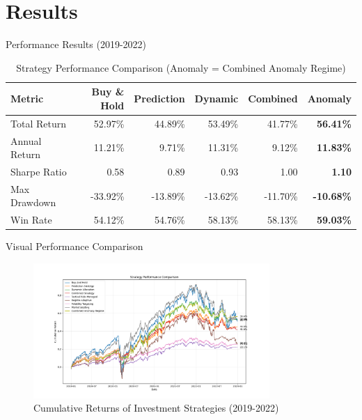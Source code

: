 \documentclass[aspectratio=169,xcolor=dvipsnames]{beamer}
\begin{document}
\section{Results}
\begin{frame}{Performance Results (2019-2022)}
	\begin{table}
		\begin{tabular}{l r r r r r}
			\toprule
			\textbf{Metric} & \textbf{Buy \& Hold} & \textbf{Prediction} & \textbf{Dynamic} & \textbf{Combined} & \textbf{Anomaly}  \\
			\midrule
			Total Return    & 52.97\%              & 44.89\%             & 53.49\%          & 41.77\%           & \textbf{56.41\%}  \\
			Annual Return   & 11.21\%              & 9.71\%              & 11.31\%          & 9.12\%            & \textbf{11.83\%}  \\
			Sharpe Ratio    & 0.58                 & 0.89                & 0.93             & 1.00              & \textbf{1.10}     \\
			Max Drawdown    & -33.92\%             & -13.89\%            & -13.62\%         & -11.70\%          & \textbf{-10.68\%} \\
			Win Rate        & 54.12\%              & 54.76\%             & 58.13\%          & 58.13\%           & \textbf{59.03\%}  \\
			\bottomrule
		\end{tabular}
		\caption{Strategy Performance Comparison (Anomaly = Combined Anomaly Regime)}
	\end{table}
\end{frame}

\begin{frame}{Visual Performance Comparison}
	\begin{figure}
		\centering
		\includegraphics[width=0.8\textwidth]{enhanced_strategy_performance.png}
		\caption{Cumulative Returns of Investment Strategies (2019-2022)}
	\end{figure}
\end{frame}
\end{document}
